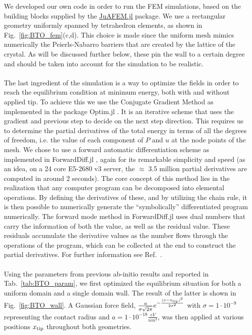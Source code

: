 We developed our own code in order to run the FEM simulations, based on the building blocks supplied by the \href{https://github.com/KristofferC/JuAFEM.jl}{JuAFEM.jl} package.
We use a rectangular geometry uniformly spanned by tetrahedron elements, as shown in Fig.~\ref{fig:BTO_fem}(c,d).
This choice is made since the uniform mesh mimics numerically the Peierls-Nabarro barriers that are created by the lattice of the crystal.
As will be discussed further below, these pin the wall to a certain degree and should be taken into account for the simulation to be realistic.
\\\\
The last ingredient of the simulation is a way to optimize the fields in order to reach the equilibrium condition at minimum energy, both with and without applied tip.
To achieve this we use the Conjugate Gradient Method \cite{Hestenes1952,Hager2005} as implemented in the package Optim.jl \cite{mogensen2018optim}.
It is an iterative scheme that uses the gradient and previous step to decide on the next step direction. 
This requires us to determine the partial derivatives of the total energy in terms of all the degrees of freedom, i.e. the value of each component of $P$ and $u$ at the node points of the mesh.
We chose to use a forward automatic differentiation scheme as implemented in ForwardDiff.jl \cite{RevelsLubinPapamarkou2016}, again for its remarkable simplicity and speed (as an idea, on a 24 core E5-2680 v3 server, the $\approx$ 3.5 million partial derivatives are computed in around 2 seconds).
The core concept of this method lies in the realization that any computer program can be decomposed into elemental operations. By defining the derivatives of these, and by utilizing the chain rule, it is then possible to numerically generate the ``symbolically'' differentiated program numerically.
The forward mode method in ForwardDiff.jl uses dual numbers that carry the information of both the value, as well as the residual value. These residuals accumulate the derivative values as the number flows through the operations of the program, which can be collected at the end to construct the partial derivatives.
For further information see Ref.~\cite{Hoffmann2016}.
\\\\
Using the parameters from previous ab-initio results \cite{Marton2010} and reported in Tab.~\ref{tab:BTO_param}, we first optimized the equilibrium situation for both a uniform domain and a single domain wall. The result of the latter is shown in Fig.~\ref{fig:BTO_wall}.
A Gaussian force field, $\frac{a}{\sigma \sqrt{2\pi}}e^{-\frac{(x-x_{\rm tip})^2}{2\sigma^2}}$ with $\sigma = 1 \cdot 10^{-9}$ representing the contact radius and $a = 1 \cdot 10^{-18} \frac{eV}{nm^3}$, was then applied at various positions $x_{\rm tip}$ throughout both geometries.


